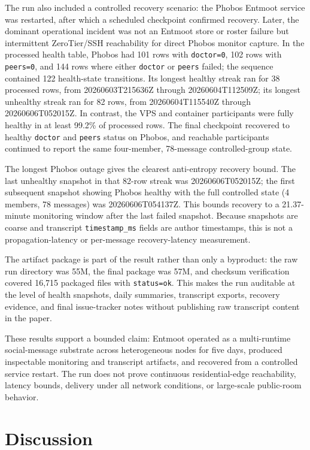 \documentclass[11pt,a4paper,twocolumn]{article}
\begin{document}
The run also included a controlled recovery scenario: the Phobos Entmoot
service was restarted, after which a scheduled checkpoint confirmed recovery.
Later, the dominant operational incident was not an Entmoot store or roster
failure but intermittent ZeroTier/SSH reachability for direct Phobos monitor
capture. In the processed health table, Phobos had 101 rows with
\texttt{doctor=0}, 102 rows with \texttt{peers=0}, and 144 rows where either
\texttt{doctor} or \texttt{peers} failed; the sequence contained 122
health-state transitions. Its longest healthy streak ran for 38 processed
rows, from 20260603T215636Z through 20260604T112509Z; its longest unhealthy
streak ran for 82 rows, from 20260604T115540Z through 20260606T052015Z. In
contrast, the VPS and container participants were fully healthy in at least
99.2\% of processed rows. The final checkpoint recovered to healthy
\texttt{doctor} and \texttt{peers} status on Phobos, and reachable participants
continued to report the same four-member, 78-message controlled-group state.

The longest Phobos outage gives the clearest anti-entropy recovery bound. The
last unhealthy snapshot in that 82-row streak was 20260606T052015Z; the first
subsequent snapshot showing Phobos healthy with the full controlled state
(4 members, 78 messages) was 20260606T054137Z. This bounds recovery to a
21.37-minute monitoring window after the last failed snapshot. Because
snapshots are coarse and transcript \texttt{timestamp\_ms} fields are author
timestamps, this is not a propagation-latency or per-message recovery-latency
measurement.

The artifact package is part of the result rather than only a byproduct: the
raw run directory was 55M, the final package was 57M, and checksum verification
covered 16,715 packaged files with \texttt{status=ok}. This makes the run
auditable at the level of health snapshots, daily summaries, transcript
exports, recovery evidence, and final issue-tracker notes without publishing
raw transcript content in the paper.

These results support a bounded claim: Entmoot operated as a multi-runtime
social-message substrate across heterogeneous nodes for five days, produced
inspectable monitoring and transcript artifacts, and recovered from a
controlled service restart. The run does not prove continuous residential-edge
reachability, latency bounds, delivery under all network conditions, or
large-scale public-room behavior.

\section{Discussion}
\label{sec:discussion}
\end{document}
